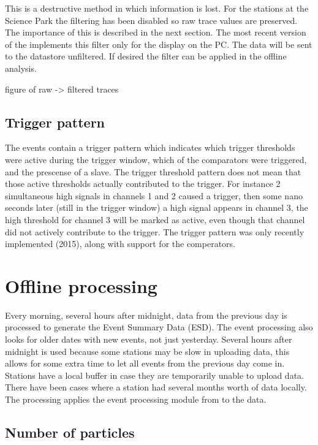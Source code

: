 This is a destructive method in which information is lost. For the \hisparc stations at the Science Park the filtering has been disabled so raw trace values are preserved. The importance of this is described in the next section. The most recent version of the \hisparc \daq [to be released] implements this filter only for the display on the \hisparc PC. The data will be sent to the datastore unfiltered. If desired the filter can be applied in the offline analysis.

figure of raw -> filtered traces


\subsection{Trigger pattern}

The \hisparc events contain a trigger pattern which indicates which trigger thresholds were active during the trigger window, which of the comparators were triggered, and the prescense of a slave. The trigger threshold pattern does not mean that those active thresholds actually contributed to the trigger. For instance 2 simultaneous high signals in channels 1 and 2 caused a trigger, then some nano seconds later (still in the trigger window) a high signal appears in channel 3, the high threshold for channel 3 will be marked as active, even though that channel did not actively contribute to the trigger. The trigger pattern was only recently implemented (2015), along with support for the comperators.


\section{Offline processing}

Every morning, several hours after midnight, data from the previous day is processed to generate the Event Summary Data (ESD). The event processing also looks for older dates with new events, not just yesterday. Several hours after midnight is used because some stations may be slow in uploading data, this allows for some extra time to let all events from the previous day come in. Stations have a local buffer in case they are temporarily unable to upload data. There have been cases where a station had several months worth of data locally. The processing applies the event processing module from \sapphire to the data.

\subsection{Number of particles}

